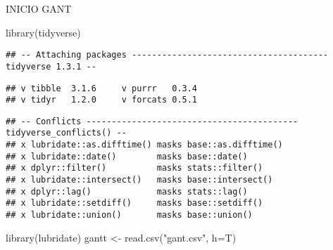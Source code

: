 \documentclass[
]{article}
\newenvironment{Shaded}{\begin{snugshade}}{\end{snugshade}}
\newcommand{\AttributeTok}[1]{\textcolor[rgb]{0.77,0.63,0.00}{#1}}
\newcommand{\FunctionTok}[1]{\textcolor[rgb]{0.00,0.00,0.00}{#1}}
\newcommand{\NormalTok}[1]{#1}
\newcommand{\OtherTok}[1]{\textcolor[rgb]{0.56,0.35,0.01}{#1}}
\newcommand{\SpecialCharTok}[1]{\textcolor[rgb]{0.00,0.00,0.00}{#1}}
\newcommand{\StringTok}[1]{\textcolor[rgb]{0.31,0.60,0.02}{#1}}
\begin{document}
INICIO GANT

\begin{Shaded}
\begin{Highlighting}[]
\FunctionTok{library}\NormalTok{(tidyverse)}
\end{Highlighting}
\end{Shaded}

\begin{verbatim}
## -- Attaching packages --------------------------------------- tidyverse 1.3.1 --
\end{verbatim}

\begin{verbatim}
## v tibble  3.1.6     v purrr   0.3.4
## v tidyr   1.2.0     v forcats 0.5.1
\end{verbatim}

\begin{verbatim}
## -- Conflicts ------------------------------------------ tidyverse_conflicts() --
## x lubridate::as.difftime() masks base::as.difftime()
## x lubridate::date()        masks base::date()
## x dplyr::filter()          masks stats::filter()
## x lubridate::intersect()   masks base::intersect()
## x dplyr::lag()             masks stats::lag()
## x lubridate::setdiff()     masks base::setdiff()
## x lubridate::union()       masks base::union()
\end{verbatim}

\begin{Shaded}
\begin{Highlighting}[]
\FunctionTok{library}\NormalTok{(lubridate)}
\NormalTok{gantt }\OtherTok{\textless{}{-}} \FunctionTok{read.csv}\NormalTok{(}\StringTok{"gant.csv"}\NormalTok{, }\AttributeTok{h=}\NormalTok{T)}
\end{Highlighting}
\end{Shaded}

\begin{Shaded}
\end{Shaded}
\end{document}
